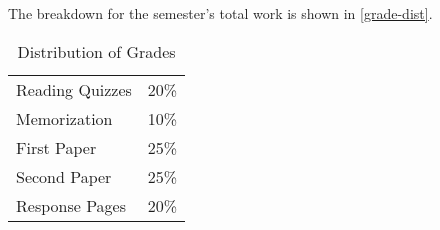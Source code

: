 \documentclass[titlepage]{article}
\newcommand\policy{../policy}
\begin{document}
The breakdown for the semester's total work is shown in
\autoref{grade-dist}.

\begin{table}[htbp]
  \centering
  {\lining
  \begin{tabular}{lr}
    \toprule
    Reading Quizzes & 20\% \\
    Memorization    & 10\% \\
    First Paper     & 25\% \\
    Second Paper    & 25\% \\
    Response Pages  & 20\% \\
    \bottomrule
  \end{tabular}}
  \caption{Distribution of Grades}
  \label{grade-dist}
\end{table}



\end{document}
